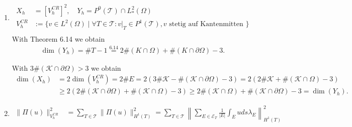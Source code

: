 
\begin{solution}

\phantom{}

\begin{enumerate}[label = \textbf{\alph*)}]
  \item
  \begin{align*}
    X_h &= [V_h^{CR}]^2, \quad Y_h = P^0(\mathcal{T}) \cap L^2_*(\Omega)\\
    V_h^{CR} &:= \{v \in L^2(\Omega) \mid \forall T \in \mathcal{T}: v|_T \in P^1(\mathcal{T}),
    v \text{ stetig auf Kantenmitten }\} \\
  \end{align*}
  With Theorem 6.14 we obtain
  \begin{align*}
  \dim(Y_h) = \# T - 1 \stackrel{6.14}{=} 2\#(K\cap \Omega) + \#(K \cap \partial\Omega) - 3.
  \end{align*}

  With $3\#(\mathcal{K} \cap \partial\Omega) > 3$ we obtain
  \begin{align*}
    \dim(X_h) &= 2\dim(V_h^{CR}) = 2\# E = 2(3\#\mathcal{K} - \#(\mathcal{K}\cap \partial\Omega) - 3)
    = 2(2\#\mathcal{K} + \#(\mathcal{K} \cap \Omega) - 3) \\
    &\geq 2(2\#(\mathcal{K} \cap \partial\Omega) + \#(\mathcal{K} \cap \Omega) - 3)
    \geq 2\#(\mathcal{K} \cap \Omega) + \#(\mathcal{K} \cap \partial\Omega) - 3 = \dim(Y_h).
  \end{align*}

  \item

  \begin{align*}
    \|\Pi(u)\|_{V_h^{CR}}^2 &= \sum_{T \in \mathcal{T}}\|\Pi(u)\|_{H^1(T)}^2
    = \sum_{T \in \mathcal{T}} \left\|\sum_{E \in \mathcal{E}_T}\frac{1}{|E|}\int_E u ds
     \lambda_E\right\|_{H^1(T)}^2
  \end{align*}


\end{enumerate}
\end{solution}
